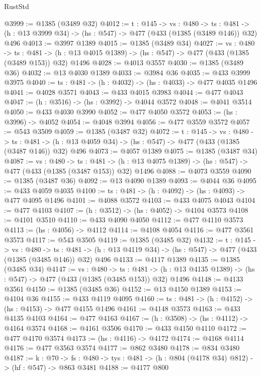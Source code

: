 \begin{lexlean}{RustStd}
\begin{coremodule}
@3999 := @1385 (@3489 @32)
@4012 := {t : @145} ->
  {vs : @480} ->
  {ts : @481} -> (h : @13 @3999 @34) -> (hs : @547) -> @477 (@433 (@1385 (@3489 @146)) @32) @496
@4013 := @3997 @1389
@4015 := @1385 (@3489 @34)
@4027 := {vs : @480} ->
  {ts : @481} -> (h : @13 @4015 @1389) -> (hs : @547) -> @477 (@433 (@1385 (@3489 @153)) @32) @1496
@4028 := @4013 @3557
@4030 := @1385 (@3489 @36)
@4032 := @13 @4030 @1389
@4033 := @3984 @36
@4035 := @433 @3999 @3975
@4040 := {ts : @481} -> (h : @4032) -> (hs : @4033) -> @477 @4035 @1496
@4041 := @4028 @3571
@4043 := @433 @4015 @3983
@4044 := @477 @4043
@4047 := (h : @3516) -> (hs : @3992) -> @4044 @3572
@4048 := @4041 @3514
@4050 := @433 @4030 @3990
@4052 := @477 @4050 @3572
@4053 := (hs : @3996) -> @4052
@4054 := @4048 @3994
@4056 := @477 @3559 @3572
@4057 := @543 @3509
@4059 := @1385 (@3487 @32)
@4072 := {t : @145} ->
  {vs : @480} ->
  {ts : @481} -> (h : @13 @4059 @34) -> (hs : @547) -> @477 (@433 (@1385 (@3487 @146)) @32) @496
@4073 := @4057 @1389
@4075 := @1385 (@3487 @34)
@4087 := {vs : @480} ->
  {ts : @481} -> (h : @13 @4075 @1389) -> (hs : @547) -> @477 (@433 (@1385 (@3487 @153)) @32) @1496
@4088 := @4073 @3559
@4090 := @1385 (@3487 @36)
@4092 := @13 @4090 @1389
@4093 := @4044 @36
@4095 := @433 @4059 @4035
@4100 := {ts : @481} -> (h : @4092) -> (hs : @4093) -> @477 @4095 @1496
@4101 := @4088 @3572
@4103 := @433 @4075 @4043
@4104 := @477 @4103
@4107 := (h : @3512) -> (hs : @4052) -> @4104 @3573
@4108 := @4101 @3510
@4110 := @433 @4090 @4050
@4112 := @477 @4110 @3573
@4113 := (hs : @4056) -> @4112
@4114 := @4108 @4054
@4116 := @477 @3561 @3573
@4117 := @543 @3505
@4119 := @1385 (@3485 @32)
@4132 := {t : @145} ->
  {vs : @480} ->
  {ts : @481} -> (h : @13 @4119 @34) -> (hs : @547) -> @477 (@433 (@1385 (@3485 @146)) @32) @496
@4133 := @4117 @1389
@4135 := @1385 (@3485 @34)
@4147 := {vs : @480} ->
  {ts : @481} -> (h : @13 @4135 @1389) -> (hs : @547) -> @477 (@433 (@1385 (@3485 @153)) @32) @1496
@4148 := @4133 @3561
@4150 := @1385 (@3485 @36)
@4152 := @13 @4150 @1389
@4153 := @4104 @36
@4155 := @433 @4119 @4095
@4160 := {ts : @481} -> (h : @4152) -> (hs : @4153) -> @477 @4155 @1496
@4161 := @4148 @3573
@4163 := @433 @4135 @4103
@4164 := @477 @4163
@4167 := (h : @3508) -> (hs : @4112) -> @4164 @3574
@4168 := @4161 @3506
@4170 := @433 @4150 @4110
@4172 := @477 @4170 @3574
@4173 := (hs : @4116) -> @4172
@4174 := @4168 @4114
@4176 := @477 @3563 @3574
@4177 := @862 @3480
@4178 := @834 @3480
@4187 := {k : @70} ->
  {fs : @480} -> {tys : @481} -> (h : @804 (@4178 @34) @812) -> (hf : @547) -> @863 @3481
@4188 := @4177 @800

\end{coremodule}
\end{lexlean}
